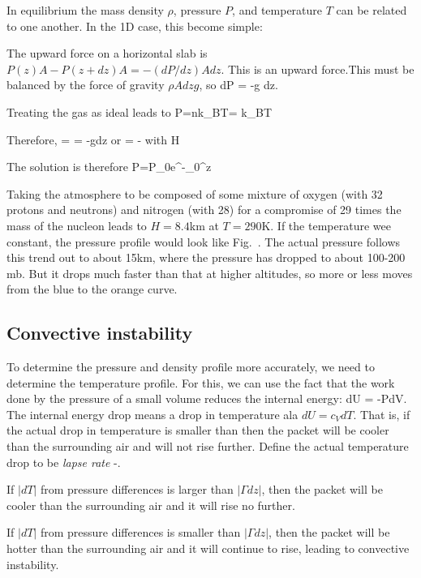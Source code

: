 \documentclass[11pt]{book}
\begin{document}
In equilibrium the mass density $\rho$, pressure $P$, and temperature $T$ can be related to one another. In the 1D case, this become simple:
\bei
\item The upward force on a horizontal slab is $P(z)A-P(z+dz)A=-(dP/dz)A dz$. This is an upward force.This must be balanced by the force of gravity $\rho Adz g$, so
\be
dP = -\rho g dz.
\ee
\item Treating the gas as ideal leads to
\be
P=nk_BT= k_BT\ee
\item Therefore,
\be
{} =  = -gdz\ee
or\be
{} = -
\ee
with \be
H\equiv {}\ee
\item The solution is therefore
\be
P=P_0e^{-\int_0^z }
\ee
\eei

Taking the atmosphere to be composed of some mixture of oxygen (with 32 protons and neutrons) and nitrogen (with 28) for a compromise of 29 times the mass of the nucleon leads to $H=8.4$km at $T=290$K. If the temperature wee constant, the pressure profile would look like Fig.~.
The actual pressure follows this trend out to about 15km, where the pressure has dropped to about 100-200 mb. But it drops much faster than that at higher altitudes, so more or less moves from the blue to the orange curve.

\subsection{Convective instability}

To determine the pressure and density profile more accurately, we need to determine the temperature profile. For this, we can use the fact that the work done by the pressure of a small volume reduces the internal energy:
\be
dU = -PdV.
\ee
The internal energy drop means a drop in temperature ala $dU=c_VdT$. That is, if the actual drop in temperature is smaller than then the packet will be cooler than the surrounding air and will not rise further. 
Define the actual temperature drop to be {\it lapse rate}
\be
\Gamma \equiv -.
\ee
\bee
\item If $|dT|$ from pressure differences is larger than $|\Gamma dz|$, then the packet will be cooler than the surrounding air and it will rise no further. 
\item If $|dT|$ from pressure differences is smaller than $|\Gamma dz|$, then the packet will be hotter than the surrounding air and it will continue to rise, leading to convective instability. 
\eee
\end{document}
